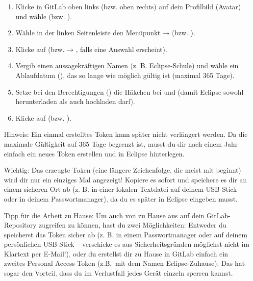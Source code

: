 \begin{enumerate}
\item Klicke in GitLab oben links (bzw. oben rechts) auf dein Profilbild (Avatar) 
und wähle  (bzw. ).
\item Wähle in der linken Seitenleiste den Menüpunkt  → 
 (bzw. ).
\item Klicke auf  (bzw.  → 
, falls eine Auswahl erscheint).
\item Vergib einen aussagekräftigen Namen (z. B. Eclipse-Schule) und wähle ein 
Ablaufdatum (), das so lange wie möglich gültig ist 
(maximal 365 Tage).
\item Setze bei den Berechtigungen () die Häkchen bei 
 und  (damit Eclipse sowohl 
herunterladen als auch hochladen darf).
\item Klicke auf  (bzw. 
).
\end{enumerate}

Hinweis: Ein einmal erstelltes Token kann später nicht verlängert werden. 
Da die maximale Gültigkeit auf 365 Tage begrenzt ist, musst du dir nach einem 
Jahr einfach ein neues Token erstellen und in Eclipse hinterlegen.

Wichtig: Das erzeugte Token (eine längere Zeichenfolge, die meist mit 
 beginnt) wird dir nur ein einziges Mal angezeigt! Kopiere es sofort 
und speichere es dir an einem sicheren Ort ab (z. B. in einer lokalen Textdatei auf 
deinem USB-Stick oder in deinem Passwortmanager), da du es später in Eclipse 
eingeben musst. 

Tipp für die Arbeit zu Hause: Um auch von zu Hause aus auf dein GitLab-Repository 
zugreifen zu können, hast du zwei Möglichkeiten: Entweder du speicherst das Token 
sicher ab (z. B. in einem Passwortmanager oder auf deinem persönlichen USB-Stick -- 
verschicke es aus Sicherheitsgründen möglichst nicht im Klartext per E-Mail!), oder 
du erstellst dir zu Hause in GitLab einfach ein zweites Personal Access Token 
(z.B.\ mit dem Namen Eclipse-Zuhause). Das hat sogar den Vorteil, dass du im 
Verlustfall jedes Gerät einzeln sperren kannst.





